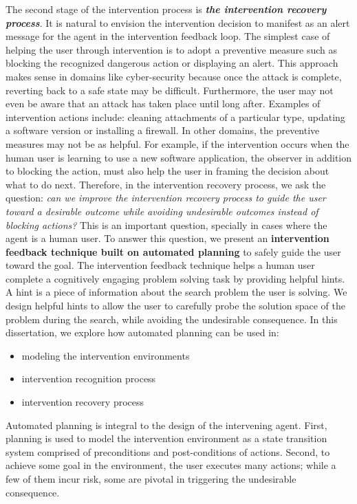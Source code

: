 The second stage of the intervention process is \textit{\textbf{the intervention recovery process}}. 
It is natural to envision the intervention decision to manifest as an alert message for the agent in the intervention feedback loop. 
The simplest case of helping the user through intervention is to adopt a preventive measure such as blocking the recognized dangerous action or displaying an alert.
This approach makes sense in domains like cyber-security because once the attack is complete, reverting back to a safe state may be difficult. 
Furthermore, the user may not even be aware that an attack has taken place until long after. 
Examples of intervention actions include: cleaning attachments of a particular type, updating a software version or installing a firewall. 
In other domains, the preventive measures may not be as helpful. 
For example, if the intervention occurs when the human user is learning to use a new software application, the observer in addition to blocking the action, must also help the user in framing the decision about what to do next.
Therefore, in the intervention recovery process, we ask the question: \textit{can we improve the intervention recovery process to guide the user toward a desirable outcome while avoiding undesirable outcomes instead of blocking actions?} 
This is an important question, specially in cases where the agent is a human user. 
To answer this question, we present an \textbf{intervention feedback technique built on automated planning} to safely guide the user toward the goal.
The intervention feedback technique helps a human user complete a cognitively engaging problem solving task by providing helpful hints. 
A hint is a piece of information about the search problem the user is solving. 
We design helpful hints to allow the user to carefully probe the solution space of the problem during the search, while avoiding the undesirable consequence.
In this dissertation, we explore how automated planning can be used in:
\begin{itemize}
\item modeling the intervention environments
\item intervention recognition process
\item intervention recovery process
\end{itemize}
Automated planning is integral to the design of the intervening agent. 
First, planning is used to model the intervention environment as a state transition system comprised of preconditions and post-conditions of actions. 
Second, to achieve some goal in the environment, the user executes many actions; while a few of them incur risk, some are pivotal in triggering the undesirable consequence. 
